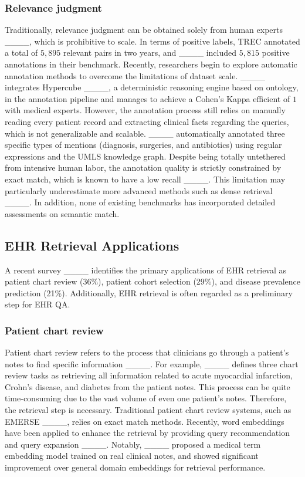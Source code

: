 \subsubsection{Relevance judgment}
Traditionally, relevance judgment can be obtained solely from human experts ____, which is prohibitive to scale.
In terms of positive labels, TREC annotated a total of $5,895$ relevant pairs in two years, and ____ included $5,815$ positive annotations in their benchmark.
Recently, researchers begin to explore automatic annotation methods to overcome the limitations of dataset scale.
____ integrates Hypercube ____, a deterministic reasoning engine based on ontology, in the annotation pipeline and manages to achieve a Cohen's Kappa efficient of $1$ with medical experts.
However, the annotation process still relies on manually reading every patient record and extracting clinical facts regarding the queries, which is not generalizable and scalable.
____ automatically annotated three specific types of mentions (diagnosis, surgeries, and antibiotics) using regular expressions and the UMLS knowledge graph.
Despite being totally untethered from intensive human labor, the annotation quality is strictly constrained by exact match, which is known to have a low recall ____.
This limitation may particularly underestimate more advanced methods such as dense retrieval ____.
In addition, none of existing benchmarks has incorporated detailed assessments on semantic match.


\subsection{EHR Retrieval Applications}
A recent survey ____ identifies the primary applications of EHR retrieval as patient chart review (36\%), patient cohort selection (29\%), and disease prevalence prediction (21\%). 
Additionally, EHR retrieval is often regarded as a preliminary step for EHR QA.

\subsubsection{Patient chart review}
Patient chart review refers to the process that clinicians go through a patient's notes to find specific information ____.
For example, ____ defines three chart review tasks as retrieving all information related to acute myocardial infarction, Crohn’s disease, and diabetes from the patient notes.
This process can be quite time-consuming due to the vast volume of even one patient's notes.
Therefore, the retrieval step is necessary.
Traditional patient chart review systems, such as EMERSE ____, relies on exact match methods.
Recently, word embeddings have been applied to enhance the retrieval by providing query recommendation and query expansion ____.
Notably, ____ proposed a medical term embedding model trained on real clinical notes, and showed significant improvement over general domain embeddings for retrieval performance.

